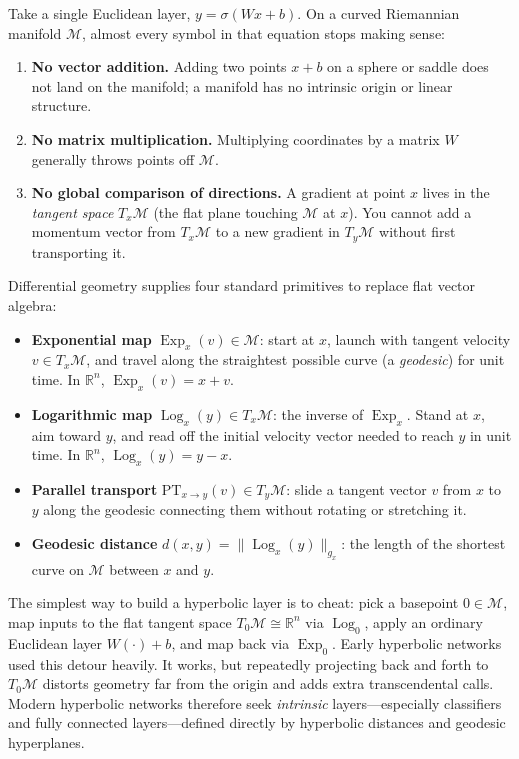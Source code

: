Take a single Euclidean layer, \(y = \sigma(Wx + b)\). On a curved Riemannian manifold \(\mathcal{M}\), almost every symbol in that equation stops making sense:
\begin{enumerate}
  \item \textbf{No vector addition.} Adding two points \(x+b\) on a sphere or saddle does not land on the manifold; a manifold has no intrinsic origin or linear structure.
  \item \textbf{No matrix multiplication.} Multiplying coordinates by a matrix \(W\) generally throws points off \(\mathcal{M}\).
  \item \textbf{No global comparison of directions.} A gradient at point \(x\) lives in the \emph{tangent space} \(T_x\mathcal{M}\) (the flat plane touching \(\mathcal{M}\) at \(x\)). You cannot add a momentum vector from \(T_x\mathcal{M}\) to a new gradient in \(T_y\mathcal{M}\) without first transporting it.
\end{enumerate}

Differential geometry supplies four standard primitives to replace flat vector algebra:
\begin{itemize}
  \item \textbf{Exponential map} \(\operatorname{Exp}_x(v)\in\mathcal{M}\): start at \(x\), launch with tangent velocity \(v\in T_x\mathcal{M}\), and travel along the straightest possible curve (a \emph{geodesic}) for unit time. In \(\mathbb{R}^n\), \(\operatorname{Exp}_x(v)=x+v\).
  \item \textbf{Logarithmic map} \(\operatorname{Log}_x(y)\in T_x\mathcal{M}\): the inverse of \(\operatorname{Exp}_x\). Stand at \(x\), aim toward \(y\), and read off the initial velocity vector needed to reach \(y\) in unit time. In \(\mathbb{R}^n\), \(\operatorname{Log}_x(y)=y-x\).
  \item \textbf{Parallel transport} \(\mathrm{PT}_{x\to y}(v)\in T_y\mathcal{M}\): slide a tangent vector \(v\) from \(x\) to \(y\) along the geodesic connecting them without rotating or stretching it.
  \item \textbf{Geodesic distance} \(d(x,y) = \|\operatorname{Log}_x(y)\|_{g_x}\): the length of the shortest curve on \(\mathcal{M}\) between \(x\) and \(y\).
\end{itemize}

\begin{remark}
The simplest way to build a hyperbolic layer is to cheat: pick a basepoint \(0\in\mathcal{M}\), map inputs to the flat tangent space \(T_0\mathcal{M}\cong\mathbb{R}^n\) via \(\operatorname{Log}_0\), apply an ordinary Euclidean layer \(W(\cdot)+b\), and map back via \(\operatorname{Exp}_0\). Early hyperbolic networks used this detour heavily. It works, but repeatedly projecting back and forth to \(T_0\mathcal{M}\) distorts geometry far from the origin and adds extra transcendental calls. Modern hyperbolic networks therefore seek \emph{intrinsic} layers---especially classifiers and fully connected layers---defined directly by hyperbolic distances and geodesic hyperplanes.
\end{remark}

